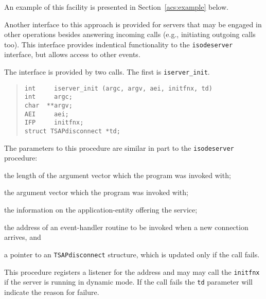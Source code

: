 An example of this facility is presented in Section~\ref{acs:example} below.

Another interface to this approach is provided for servers that may be
engaged in other operations besides answering incoming calls (e.g.,
initiating outgoing calls too). This interface provides indentical
functionality to the \verb|isodeserver| interface, but allows access
to other events.

The interface is provided by two calls. The first is \verb|iserver_init|.
\begin{quote}\small\begin{verbatim}
int     iserver_init (argc, argv, aei, initfnx, td)
int     argc;
char  **argv;
AEI     aei;
IFP     initfnx;
struct TSAPdisconnect *td;
\end{verbatim}\end{quote}

The parameters to this procedure are similar in part to the
\verb|isodeserver| procedure:
\begin{describe}
\item[\verb|argc|:] 	the length of the argument vector which the
program was invoked with;

\item[\verb|argv|:]	the argument vector which the program was
invoked with;

\item[\verb|aei|:]	the information on the application-entity
offering the service;

\item[\verb"initfnx":] the address of an event-handler routine to be invoked
when a new connection arrives, and

\item[\verb|td|:]	a pointer to an \verb"TSAPdisconnect" structure,
which is updated only if the call fails.
\end{describe}

This procedure registers a listener for the address and may may call
the \verb|initfnx| if the server is running in dynamic mode. If the
call fails the \verb|td| parameter will indicate the reason for
failure.


